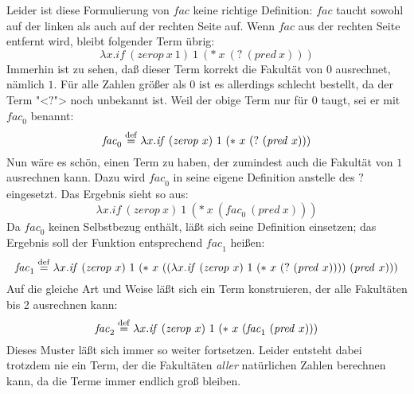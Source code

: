 Leider ist diese Formulierung von $\mathit{fac}$ keine richtige
Definition: $\mathit{fac}$ taucht sowohl auf der linken
als auch auf der rechten Seite auf.  Wenn $\mathit{fac}$ aus der
rechten Seite entfernt wird, bleibt folgender Term übrig:
%
\begin{displaymath}
  \lambda x.\mathit{if}~(\mathit{zerop}~x~1)~1~(\ast~x~(?~(\mathit{pred}~x)))
\end{displaymath}
%
Immerhin ist zu sehen, daß dieser Term korrekt die Fakultät von $0$
ausrechnet, nämlich $1$.  Für alle Zahlen größer als $0$ ist es allerdings
schlecht bestellt, da der Term "<$?$"> noch unbekannt ist.
Weil der obige Term nur für $0$ taugt, sei er mit $\mathit{fac}_0$
benannt:
%
\begin{displaymath}
  \mathit{fac}_0 \stackrel{\rm def}{=} \lambda x.\mathit{if}~(\mathit{zerop}~x)~1~(\ast~x~(?~(\mathit{pred}~x)))
\end{displaymath}
%
Nun wäre es schön, einen Term zu haben, der zumindest auch die
Fakultät von $1$ ausrechnen kann.  Dazu wird $\mathit{fac}_0$ in
seine eigene Definition anstelle des $?$ eingesetzt.  Das Ergebnis
sieht so aus:
%
\begin{displaymath}
  \lambda x.\mathit{if}~(\mathit{zerop}~x)~1~(\ast~x~(\mathit{fac}_0~(\mathit{pred}~x)))
\end{displaymath}
%
Da $\mathit{fac}_0$ keinen Selbstbezug enthält, läßt sich seine
Definition einsetzen; das Ergebnis soll der Funktion entsprechend
$\mathit{fac}_1$ heißen:
%
\begin{displaymath}
  \mathit{fac}_1 \stackrel{\rm def}{=}{} \lambda x.\mathit{if}~(\mathit{zerop}~x)~1~(\ast~x~((\lambda x.\mathit{if}~(\mathit{zerop}~x)~1~(\ast~x~(?~(\mathit{pred}~x))))~(\mathit{pred}~x)))
\end{displaymath}
%
Auf die gleiche Art und Weise läßt sich ein Term konstruieren, der
alle Fakultäten bis 2 ausrechnen kann:
%
\begin{displaymath}
  \mathit{fac}_2 \stackrel{\rm def}{=}{} \lambda x.\mathit{if}~(\mathit{zerop}~x)~1~(\ast~x~(\mathit{fac}_1~(\mathit{pred}~x)))
\end{displaymath}
%
Dieses Muster läßt sich immer so weiter fortsetzen.  Leider entsteht
dabei trotzdem nie ein Term, der die Fakultäten \emph{aller}
natürlichen Zahlen berechnen kann, da die Terme immer endlich groß
bleiben.

